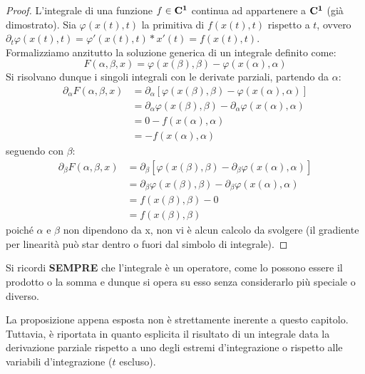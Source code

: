 \begin{proof}
	L'integrale di una funzione $ f \in \mathbf{C^{1}} $ continua ad appartenere a $ \mathbf{C^{1}} $ (già dimostrato).
	Sia $ \varphi(x(t),t) $ la primitiva di $ f(x(t),t) $ rispetto a $ t $,
	ovvero $ \partial_t \varphi(x(t),t) = \varphi'(x(t),t)*x'(t) = f(x(t),t) $.\\
	Formalizziamo anzitutto la soluzione generica di un integrale definito come:
	\[F(\alpha,\beta,x) = \varphi(x(\beta),\beta) - \varphi(x(\alpha),\alpha) \]
	Si risolvano dunque i singoli integrali con le derivate parziali, partendo da $ \alpha $:
	\begin{align*}
		\partial_\alpha F(\alpha,\beta,x) &= \partial_\alpha \left[\varphi(x(\beta),\beta) - \varphi(x(\alpha),\alpha)\right]\\
		&= \partial_\alpha \varphi(x(\beta),\beta) - \partial_\alpha \varphi(x(\alpha),\alpha)\\
		&= 0 - f(x(\alpha),\alpha)\\
		&= - f(x(\alpha),\alpha)
	\end{align*}
	seguendo con $ \beta $:
	\begin{align*}
		\partial_\beta F(\alpha,\beta,x) &= \partial_\beta \left[\varphi(x(\beta),\beta) - \partial_\beta \varphi(x(\alpha),\alpha)\right]\\
		&= \partial_\beta \varphi(x(\beta),\beta) - \partial_\beta \varphi(x(\alpha),\alpha)\\
		&= f(x(\beta),\beta) - 0\\
		&= f(x(\beta),\beta)
	\end{align*}
	poiché $ \alpha $ e $ \beta $ non dipendono da x, non vi è alcun calcolo da svolgere
	(il gradiente per linearità può star dentro o fuori dal simbolo di integrale).
\end{proof}
\begin{note}
	Si ricordi \textbf{SEMPRE} che l'integrale è un operatore, come lo possono essere il prodotto o la somma e dunque si opera su esso
	senza considerarlo più speciale o diverso.
\end{note}
\begin{note}
	La proposizione appena esposta non è strettamente inerente a questo capitolo. Tuttavia, è riportata in quanto esplicita il risultato di un integrale
	data la derivazione parziale rispetto a uno degli estremi d'integrazione o rispetto alle variabili d'integrazione ($ t $ escluso). 
\end{note}

\newpage
